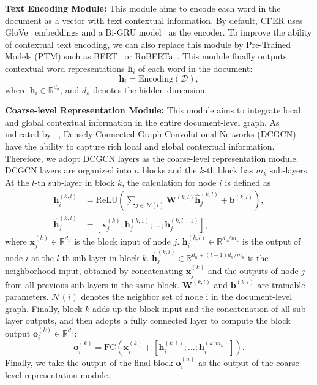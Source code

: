 \documentclass{article}
\newcommand{\citep}{\cite}
\newcommand{\citet}[1]{\citeauthor{#1}~\shortcite{#1}}
\begin{document}
\noindent\textbf{Text Encoding Module:} 
This module aims to encode each word in the document as a vector with text contextual information. 
By default, CFER uses GloVe~\citep{glove} embeddings and a Bi-GRU model~\citep{gru,bi_rnn} as the encoder. 
To improve the ability of contextual text encoding, we can also replace this module by Pre-Trained Models (PTM) such as BERT~\citep{bert} or RoBERTa~\citep{roberta}. 
This module finally outputs contextual word representations $\mathbf{h}_{i}$ of each word in the document: 
\begin{equation}
    \mathbf{h}_{i} = \text{Encoding} (\mathcal{D}),
\end{equation}
where $\mathbf{h}_{i} \in \mathbb{R}^{d_h}$, and $d_h$ denotes the hidden dimension. 

\noindent\textbf{Coarse-level Representation Module:} 
This module aims to integrate local and global contextual information in the entire document-level graph. 
As indicated by \citet{dcgcn}, Densely Connected Graph Convolutional Networks (DCGCN) have the ability to capture rich local and global contextual information. 
Therefore, we adopt DCGCN layers as the coarse-level representation module. 
DCGCN layers are organized into $n$ blocks and the $k$-th block has $m_k$ sub-layers. 
At the $l$-th sub-layer in block $k$, the calculation for node $i$ is defined as 
\begin{align}
    \mathbf{h}_i^{(k, l)} &= \text{ReLU} \left( \sum_{j \in \mathcal{N}(i)} \mathbf{W}^{(k, l)} \hat{\mathbf{h}}_{j}^{(k, l)} + \mathbf{b}^{(k, l)} \right), \\
    \hat{\mathbf{h}}_{j}^{(k, l)} &= [\mathbf{x}_j^{(k)}; \mathbf{h}_j^{(k, 1)}; ...; \mathbf{h}_j^{(k, l-1)}], 
\end{align}
where $\mathbf{x}_j^{(k)} \in \mathbb{R}^{d_h}$ is the block input of node $j$. 
$\mathbf{h}_i^{(k, l)} \in \mathbb{R}^{d_h/m_k}$ is the output of node $i$ at the $l$-th sub-layer in block $k$. 
$\hat{\mathbf{h}}_{j}^{(k, l)} \in \mathbb{R}^{d_h + (l - 1) d_h/m_k}$ is the neighborhood input, obtained by concatenating $\mathbf{x}_j^{(k)}$ and the outputs of node $j$ from all previous sub-layers in the same block. 
$\mathbf{W}^{(k, l)}$ and $\mathbf{b}^{(k, l)}$ are trainable parameters. 
$\mathcal{N}(i)$ denotes the neighbor set of node i in the document-level graph. 
Finally, block $k$ adds up the block input and the concatenation of all sub-layer outputs, and then adopts a fully connected layer to compute the block output $\mathbf{o}_i^{(k)} \in \mathbb{R}^{d_h}$: 
\begin{equation}
    \mathbf{o}_i^{(k)} = \text{FC} \left(\mathbf{x}_i^{(k)} + [\mathbf{h}_i^{(k, 1)}; ...; \mathbf{h}_i^{(k, m_k)}]\right). 
\end{equation}
Finally, we take the output of the final block $\mathbf{o}_i^{(n)}$ as the output of the coarse-level representation module. 
\end{document}
